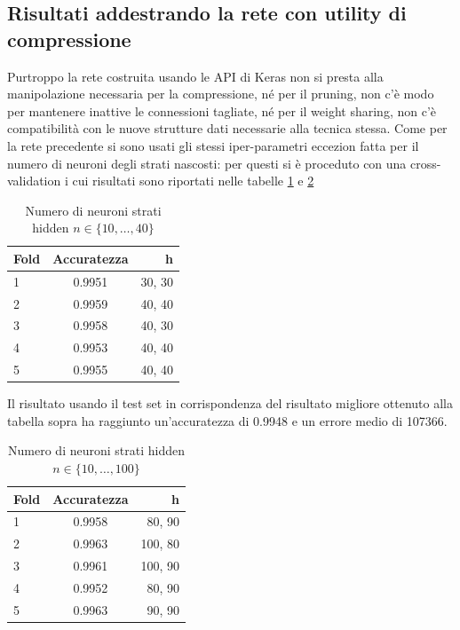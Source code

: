 \documentclass[12pt]{report}
\begin{document}
\par\null\par
\par\null\par

\subsection{Risultati addestrando la rete con utility di compressione}\label{reteAdHoc}
Purtroppo la rete costruita usando le API di Keras non si presta alla manipolazione necessaria per la compressione, né per il pruning, non c’è modo per mantenere inattive le connessioni tagliate, né per il weight sharing, non c’è compatibilità con le nuove strutture dati necessarie alla tecnica stessa.
Come per la rete precedente si sono usati gli stessi iper-parametri eccezion fatta per il numero di neuroni degli strati nascosti: per questi si è proceduto con una cross-validation i cui risultati sono riportati nelle tabelle \ref{hoc2_10_40} e \ref{hoc2_10_100}
\par\null\par
\begin{table}[H]
\begin{center}
\begin{tabular}{lcr}
\toprule
Fold & Accuratezza & h \\
\midrule
1 & 0.9951 & 30, 30\\
2 & 0.9959 & 40, 40\\
3 & 0.9958 & 40, 30\\
4 & 0.9953 & 40, 40\\
5 & 0.9955 & 40, 40\\
\bottomrule
\end{tabular}
\end{center}
\caption{Numero di neuroni strati hidden $n \in \{10, \dots, 40 \}$}
\label{hoc2_10_40}
\end{table}

Il risultato usando il test set in corrispondenza del risultato migliore ottenuto alla tabella sopra ha raggiunto un'accuratezza di 0.9948 e un errore medio di 107366.

\null\par\null

\begin{table}[H]
\begin{center}
\begin{tabular}{lcr}
\toprule
Fold & Accuratezza & h \\
\midrule
1 & 0.9958 & 80, 90\\
2 & 0.9963 & 100, 80\\
3 & 0.9961 & 100, 90\\
4 & 0.9952 & 80, 90\\
5 & 0.9963 & 90, 90\\
\bottomrule
\end{tabular}
\end{center}
\caption{Numero di neuroni strati hidden $n \in \{10, \dots, 100 \}$}
\label{hoc2_10_100}
\end{table}
\end{document}
